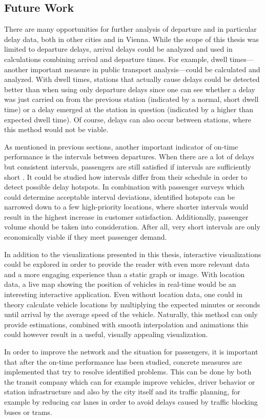 \subsection{Future Work}
\label{sec:future}

There are many opportunities for further analysis of departure and in particular delay data, both in other cities and in Vienna. While the scope of this thesis was limited to departure delays, arrival delays could be analyzed and used in calculations combining arrival and departure times. For example, dwell times---another important measure in public transport analysis---could be calculated and analyzed. With dwell times, stations that actually cause delays could be detected better than when using only departure delays since one can see whether a delay was just carried on from the previous station (indicated by a normal, short dwell time) or a delay emerged at the station in question (indicated by a higher than expected dwell time). Of course, delays can also occur between stations, where this method would not be viable.

As mentioned in previous sections, another important indicator of on-time performance is the intervals between departures. When there are a lot of delays but consistent intervals, passengers are still satisfied if intervals are sufficiently short \autocite[378]{van-oort-2015}. It could be studied how intervals differ from their schedule in order to detect possible delay hotspots. In combination with passenger surveys which could determine acceptable interval deviations, identified hotspots can be narrowed down to a few high-priority locations, where shorter intervals would result in the highest increase in customer satisfaction. Additionally, passenger volume should be taken into consideration. After all, very short intervals are only economically viable if they meet passenger demand.

In addition to the visualizations presented in this thesis, interactive visualizations could be explored in order to provide the reader with even more relevant data and a more engaging experience than a static graph or image. With location data, a live map showing the position of vehicles in real-time would be an interesting interactive application. Even without location data, one could in theory calculate vehicle locations by multiplying the expected minutes or seconds until arrival by the average speed of the vehicle. Naturally, this method can only provide estimations, combined with smooth interpolation and animations this could however result in a useful, visually appealing visualization.

In order to improve the network and the situation for passengers, it is important that after the on-time performance has been studied, concrete measures are implemented that try to resolve identified problems. This can be done by both the transit company which can for example improve vehicles, driver behavior or station infrastructure and also by the city itself and its traffic planning, for example by reducing car lanes in order to avoid delays caused by traffic blocking buses or trams. 